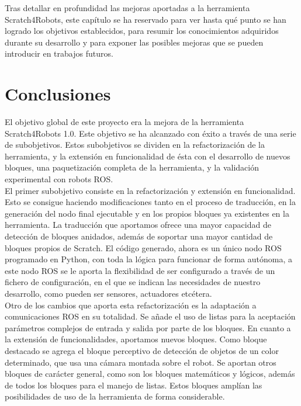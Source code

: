 Tras detallar en profundidad las mejoras aportadas a la herramienta Scratch4Robots,  este capítulo se ha reservado para ver hasta qué punto se han logrado los objetivos establecidos, para resumir los conocimientos adquiridos durante su desarrollo y para exponer las posibles mejoras que se pueden introducir en trabajos futuros.

\section{Conclusiones}
\label{sec:conclusiones}

El objetivo global de este proyecto era la mejora de la herramienta Scratch4Robots 1.0. Este objetivo se ha alcanzado con éxito a través de una serie de subobjetivos. Estos subobjetivos se dividen en la refactorización de la herramienta, y la extensión en funcionalidad de ésta con el desarrollo de nuevos bloques, una paquetización completa de la herramienta, y la validación experimental con robots ROS.\\

El primer subobjetivo consiste en la refactorización y extensión en funcionalidad. Esto se consigue haciendo modificaciones tanto en el proceso de traducción, en la generación del nodo final ejecutable y en los propios bloques ya existentes en la herramienta. La traducción que aportamos ofrece una mayor capacidad de detección de bloques anidados, además de soportar una mayor cantidad de bloques propios de Scratch. El código generado, ahora es un único nodo ROS programado en Python, con toda la lógica para funcionar de forma autónoma, a este nodo ROS se le aporta la flexibilidad de ser configurado a través de un fichero de configuración, en el que se indican las necesidades de nuestro desarrollo, como pueden ser sensores, actuadores etcétera. \\

Otro de los cambios que aporta esta refactorización es la adaptación a comunicaciones ROS en su totalidad. Se añade el uso de listas para la aceptación parámetros complejos de entrada y salida por parte de los bloques. En cuanto a la extensión de funcionalidades, aportamos nuevos bloques. Como bloque destacado se agrega el bloque perceptivo de detección de objetos de un color determinado, que usa una cámara montada sobre el robot. Se aportan otros bloques de carácter general, como son los bloques matemáticos y lógicos, además de todos los bloques para el manejo de listas. Estos bloques amplían las posibilidades de uso de la herramienta de forma considerable.\\

